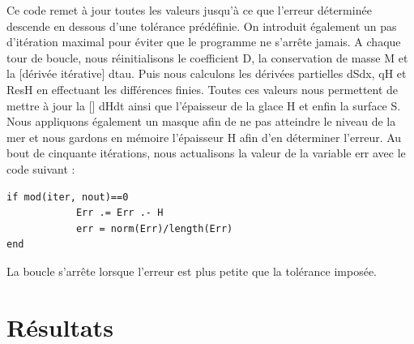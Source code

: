 \documentclass{article}
\begin{document}
\newline
Ce code remet à jour toutes les valeurs jusqu'à ce que l'erreur déterminée descende en dessous d'une tolérance prédéfinie. On introduit également un pas d'itération maximal pour éviter que le programme ne s'arrête jamais.
\newline
A chaque tour de boucle, nous réinitialisons le coefficient D, la conservation de masse M et la [dérivée itérative] dtau. Puis nous calculons les dérivées partielles dSdx, qH et ResH en effectuant les différences finies. Toutes ces valeurs nous permettent de mettre à jour la [] dHdt ainsi que l'épaisseur de la glace H et enfin la surface S. Nous appliquons également un masque afin de ne pas atteindre le niveau de la mer et nous gardons en mémoire l'épaisseur H afin d'en déterminer l'erreur.
\newline
Au bout de cinquante itérations, nous actualisons la valeur de la variable err avec le code suivant :
\begin{verbatim}
if mod(iter, nout)==0 
            Err .= Err .- H
            err = norm(Err)/length(Err) 
end
\end{verbatim}
La boucle s'arrête lorsque l'erreur est plus petite que la tolérance imposée.

\section{Résultats}
\end{document}
